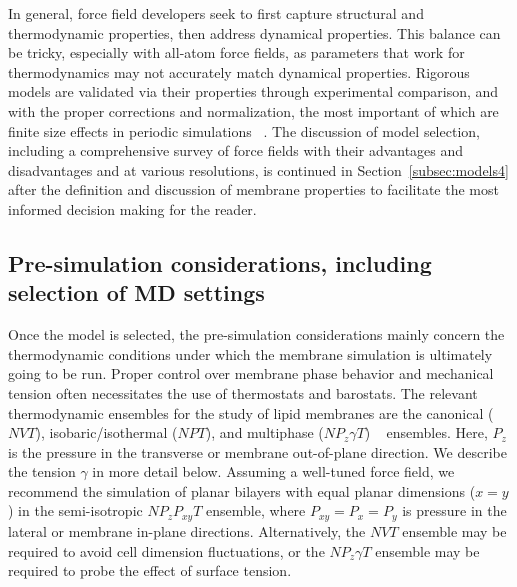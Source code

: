 \documentclass[9pt,bestpractices,pubversion]{livecoms}
\begin{document}
In general, force field developers seek to first capture structural and thermodynamic properties, then address dynamical properties.
This balance can be tricky, especially with all-atom force fields, as parameters that work for thermodynamics may not accurately match dynamical properties.
Rigorous models are validated via their properties through experimental comparison, and with the proper corrections and normalization, the most important of which are finite size effects in periodic simulations  ~\cite{Venable2017,Klauda2006b}.
The discussion of model selection, including a comprehensive survey of force fields with their advantages and disadvantages and at various resolutions, is continued in Section~\ref{subsec:models4} after the definition and discussion of membrane properties to facilitate the most informed decision making for the reader.

\subsection{Pre-simulation considerations, including selection of MD settings}
\label{subsec:presim3}
Once the model is selected, the pre-simulation considerations mainly concern the thermodynamic conditions under which the membrane simulation is ultimately going to be run.
Proper control over membrane phase behavior and mechanical tension often necessitates the use of thermostats and barostats.
The relevant thermodynamic ensembles for the study of lipid membranes are the canonical ($NVT$), isobaric/isothermal ($NPT$), and multiphase ($NP_z \gamma T$) ~\cite{Devireddy2010} ensembles.
Here, $P_z$ is the pressure in the transverse or membrane out-of-plane direction.
We describe the tension $\gamma$ in more detail below.
Assuming a well-tuned force field, we recommend the simulation of planar bilayers with equal planar dimensions ($x=y$) in the semi-isotropic $NP_{z}P_{xy}T$ ensemble, where $P_{xy} = P_x = P_y$ is pressure in the lateral or membrane in-plane directions.
Alternatively, the $NVT$ ensemble may be required to avoid cell dimension fluctuations, or the $NP_z \gamma T$ ensemble may be required to probe the effect of surface tension.
\end{document}
